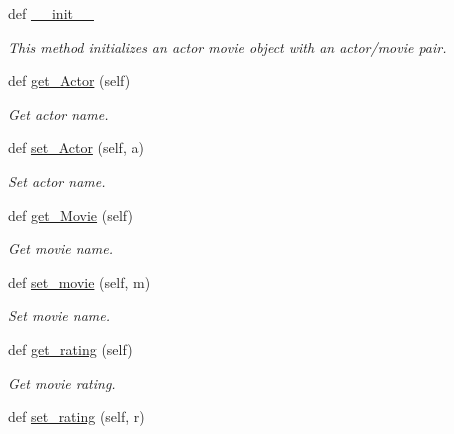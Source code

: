 \begin{DoxyCompactItemize}
\item 
def \hyperlink{class_bridges_1_1data__src__dependent_1_1_actor_movie_i_m_d_b_1_1_actor_movie_i_m_d_b_a342d59ff6ee6eeaac2523d1183f895d0}{\+\_\+\+\_\+init\+\_\+\+\_\+}
\begin{DoxyCompactList}\small\item\em This method initializes an actor movie object with an actor/movie pair. \end{DoxyCompactList}\item 
def \hyperlink{class_bridges_1_1data__src__dependent_1_1_actor_movie_i_m_d_b_1_1_actor_movie_i_m_d_b_afc16aa7948b4c9fa076ea890cb891cf7}{get\+\_\+\+Actor} (self)
\begin{DoxyCompactList}\small\item\em Get actor name. \end{DoxyCompactList}\item 
def \hyperlink{class_bridges_1_1data__src__dependent_1_1_actor_movie_i_m_d_b_1_1_actor_movie_i_m_d_b_a6cf512c409c0dd97614d1e29b12e0bba}{set\+\_\+\+Actor} (self, a)
\begin{DoxyCompactList}\small\item\em Set actor name. \end{DoxyCompactList}\item 
def \hyperlink{class_bridges_1_1data__src__dependent_1_1_actor_movie_i_m_d_b_1_1_actor_movie_i_m_d_b_aa7e7bbac99ea456083017cf459ec0ef7}{get\+\_\+\+Movie} (self)
\begin{DoxyCompactList}\small\item\em Get movie name. \end{DoxyCompactList}\item 
def \hyperlink{class_bridges_1_1data__src__dependent_1_1_actor_movie_i_m_d_b_1_1_actor_movie_i_m_d_b_aa8d2ad1bc8fffd5c8702429391aa4bcf}{set\+\_\+movie} (self, m)
\begin{DoxyCompactList}\small\item\em Set movie name. \end{DoxyCompactList}\item 
def \hyperlink{class_bridges_1_1data__src__dependent_1_1_actor_movie_i_m_d_b_1_1_actor_movie_i_m_d_b_a673834d4dd07d708e7ad64d85ba8cdf2}{get\+\_\+rating} (self)
\begin{DoxyCompactList}\small\item\em Get movie rating. \end{DoxyCompactList}\item 
def \hyperlink{class_bridges_1_1data__src__dependent_1_1_actor_movie_i_m_d_b_1_1_actor_movie_i_m_d_b_a13d1802f758ca8c7aeedc089c82a0add}{set\+\_\+rating} (self, r)

\end{DoxyCompactItemize}
